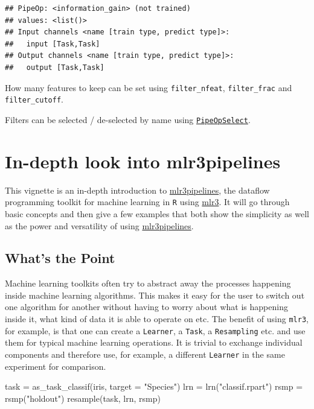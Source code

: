 \documentclass[
]{scrbook}
\newenvironment{Shaded}{\begin{snugshade}}{\end{snugshade}}
\newcommand{\AttributeTok}[1]{\textcolor[rgb]{0.77,0.63,0.00}{#1}}
\newcommand{\FunctionTok}[1]{\textcolor[rgb]{0.00,0.00,0.00}{#1}}
\newcommand{\NormalTok}[1]{#1}
\newcommand{\OtherTok}[1]{\textcolor[rgb]{0.56,0.35,0.01}{#1}}
\newcommand{\StringTok}[1]{\textcolor[rgb]{0.31,0.60,0.02}{#1}}
\renewenvironment{Shaded} {\begin{snugshade}\small} {\end{snugshade}}
\begin{document}
\begin{verbatim}
## PipeOp: <information_gain> (not trained)
## values: <list()>
## Input channels <name [train type, predict type]>:
##   input [Task,Task]
## Output channels <name [train type, predict type]>:
##   output [Task,Task]
\end{verbatim}

How many features to keep can be set using \texttt{filter\_nfeat}, \texttt{filter\_frac} and \texttt{filter\_cutoff}.

Filters can be selected / de-selected by name using \href{https://mlr3pipelines.mlr-org.com/reference/mlr_pipeops_select.html}{\texttt{PipeOpSelect}}.

\hypertarget{in-depth-pipelines}{%
\section{In-depth look into mlr3pipelines}\label{in-depth-pipelines}}

This vignette is an in-depth introduction to \href{https://cran.r-project.org/package=mlr3pipelines}{mlr3pipelines}, the dataflow programming toolkit for machine learning in \texttt{R} using \href{https://mlr3.mlr-org.com}{mlr3}.
It will go through basic concepts and then give a few examples that both show the simplicity as well as the power and versatility of using \href{https://cran.r-project.org/package=mlr3pipelines}{mlr3pipelines}.

\hypertarget{whats-the-point}{%
\subsection{What's the Point}\label{whats-the-point}}

Machine learning toolkits often try to abstract away the processes happening inside machine learning algorithms.
This makes it easy for the user to switch out one algorithm for another without having to worry about what is happening inside it, what kind of data it is able to operate on etc.
The benefit of using \texttt{mlr3}, for example, is that one can create a \texttt{Learner}, a \texttt{Task}, a \texttt{Resampling} etc. and use them for typical machine learning operations.
It is trivial to exchange individual components and therefore use, for example, a different \texttt{Learner} in the same experiment for comparison.

\begin{Shaded}
\begin{Highlighting}[]
\NormalTok{task }\OtherTok{=} \FunctionTok{as\_task\_classif}\NormalTok{(iris, }\AttributeTok{target =} \StringTok{"Species"}\NormalTok{)}
\NormalTok{lrn }\OtherTok{=} \FunctionTok{lrn}\NormalTok{(}\StringTok{"classif.rpart"}\NormalTok{)}
\NormalTok{rsmp }\OtherTok{=} \FunctionTok{rsmp}\NormalTok{(}\StringTok{"holdout"}\NormalTok{)}
\FunctionTok{resample}\NormalTok{(task, lrn, rsmp)}
\end{Highlighting}
\end{Shaded}
\end{document}

